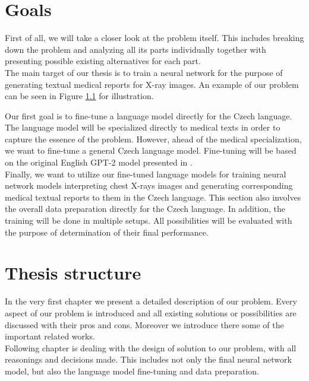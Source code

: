 \section*{Goals}
First of all, we will take a closer look at the problem itself. This includes breaking down the problem and analyzing all its parts individually together with presenting possible existing alternatives for each part. \\

The main target of our thesis is to train a neural network for the purpose of generating textual medical reports for X-ray images. An example of our problem can be seen in Figure \hyperref[fig01:ProblemExample]{1.1} for illustration.\\
\newpage

Our first goal is to fine-tune a language model directly for the Czech language. The language model will be specialized directly to medical texts in order to capture the essence of the problem. However, ahead of the medical specialization, we want to fine-tune a general Czech language model. Fine-tuning will be based on the original English GPT-2 model presented in \citet{radford2019language}.\\

Finally, we want to utilize our fine-tuned language models for training neural network models interpreting chest X-rays images and generating corresponding medical textual reports to them in the Czech language. This section also involves the overall data preparation directly for the Czech language. In addition, the training will be done in multiple setups. All possibilities will be evaluated with the purpose of determination of their final performance.\\

\section*{Thesis structure}

In the very first chapter we present a detailed description of our problem. Every aspect of our problem is introduced and all existing solutions or possibilities are discussed with their pros and cons. Moreover we introduce there some of the important related works.\\

Following chapter is dealing with the design of solution to our problem, with all reasonings and decisions made. This includes not only the final neural network model, but also the language model fine-tuning and data preparation.\\


